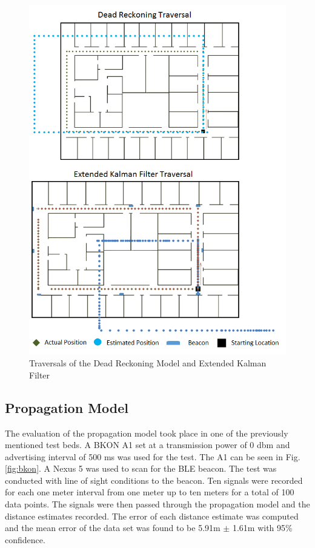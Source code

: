 \documentclass[conference]{IEEEtran}
\begin{document}
\begin{figure}[]
\centering
\includegraphics[scale=0.5]{TraversalMap.png}
\caption{Traversals of the Dead Reckoning Model and Extended Kalman Filter}
\captionsetup{justification=centering,margin=2cm}
\label{fig:traversalmap}
\end{figure}

\subsection{Propagation Model}

The evaluation of the propagation model took place in one of the previously mentioned test beds. A BKON A1 set at a transmission power of 0 dbm and advertising interval of 500 ms was used for the test. The A1 can be seen in Fig. \ref{fig:bkon}. A Nexus 5 was used to scan for the BLE beacon. The test was conducted with line of sight conditions to the beacon. Ten signals were recorded for each one meter interval from one meter up to ten meters for a total of 100 data points. The signals were then passed through the propagation model and the distance estimates recorded. The error of each distance estimate was computed and the mean error of the data set was found to be 5.91m $\pm$ 1.61m with 95\% confidence.
\end{document}
